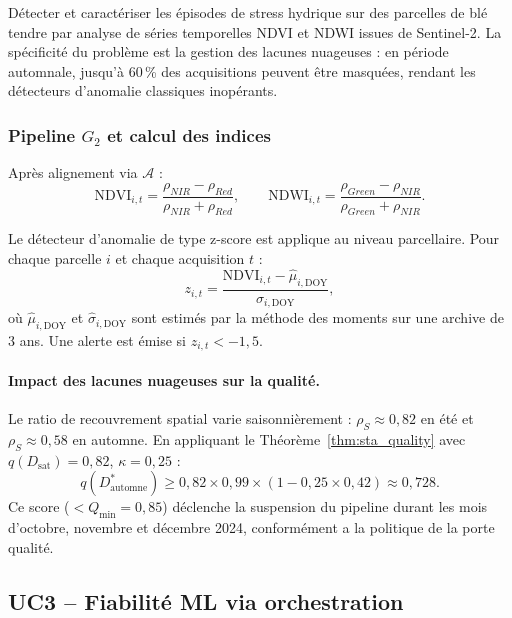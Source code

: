 \documentclass[12pt]{article}
\begin{document}
Détecter et caractériser les épisodes de stress hydrique sur des
parcelles de blé tendre par analyse de séries temporelles NDVI et NDWI
issues de Sentinel-2. La spécificité du problème est la gestion des
lacunes nuageuses : en période automnale, jusqu’à 60\,\% des acquisitions
peuvent être masquées, rendant les détecteurs d'anomalie classiques
inopérants.

\subsubsection{Pipeline $G_2$ et calcul des indices}

Après alignement via $\mathcal{A}$ :
\begin{equation}
	\text{NDVI}_{i,t} = \frac{\rho_{NIR} - \rho_{Red}}{\rho_{NIR} + \rho_{Red}},
	\qquad
	\text{NDWI}_{i,t} = \frac{\rho_{Green} - \rho_{NIR}}{\rho_{Green} + \rho_{NIR}}.
	\label{eq:indices}
\end{equation}

Le détecteur d'anomalie de type z-score est applique au niveau parcellaire.
Pour chaque parcelle $i$ et chaque acquisition $t$ :
\begin{equation}
	z_{i,t} = \frac{\text{NDVI}_{i,t} - \hat\mu_{i,\text{DOY}}}
	{\hat\sigma_{i,\text{DOY}}},
	\label{eq:zscore}
\end{equation}
où $\hat\mu_{i,\text{DOY}}$ et $\hat\sigma_{i,\text{DOY}}$ sont estimés
par la méthode des moments sur une archive de 3 ans. Une alerte est émise si $z_{i,t} < -1{,}5$.

\paragraph{Impact des lacunes nuageuses sur la qualité.}  Le ratio de recouvrement spatial varie saisonnièrement :
$\rho_S \approx 0{,}82$ en été et $\rho_S \approx 0{,}58$ en automne.
En appliquant le Théorème~\ref{thm:sta_quality} avec
$q(D_{\text{sat}}) = 0{,}82$, $\kappa=0{,}25$ :
\begin{equation}
	q(D^*_{\text{automne}}) \geq 0{,}82 \times 0{,}99 \times
	(1 - 0{,}25 \times 0{,}42) \approx 0{,}728.
	\label{eq:uc2_qual}
\end{equation}
Ce score ($<Q_{\min}=0{,}85$) déclenche la suspension du pipeline durant les mois d'octobre, novembre et décembre 2024, conformément a la politique de la porte qualité.

	
\subsection{UC3 -- Fiabilité ML via orchestration}
\label{subsec:uc3}
\end{document}
